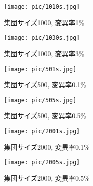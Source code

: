 \documentclass[a4j]{jarticle}
\begin{document}
\begin{figure}[htb]
 \begin{minipage}{0.5\hsize}
  \begin{center}
  \texttt{[image: pic/1010s.jpg]}
  \end{center}
  \caption{集団サイズ1000, 変異率1\%}
  \label{1010s}
 \end{minipage}
 \begin{minipage}{0.5\hsize}
  \begin{center}
  \texttt{[image: pic/1030s.jpg]}
  \end{center}
  \caption{集団サイズ1000, 変異率3\%}
  \label{1030s}
 \end{minipage}
\end{figure}

\begin{figure}[htb]
 \begin{minipage}{0.5\hsize}
  \begin{center}
  \texttt{[image: pic/501s.jpg]}
  \end{center}
  \caption{集団サイズ500, 変異率0.1\%}
  \label{501s}
 \end{minipage}
 \begin{minipage}{0.5\hsize}
  \begin{center}
  \texttt{[image: pic/505s.jpg]}
  \end{center}
  \caption{集団サイズ500, 変異率0.5\%}
  \label{505s}
 \end{minipage}
\end{figure}

\begin{figure}[htb]
 \begin{minipage}{0.5\hsize}
  \begin{center}
  \texttt{[image: pic/2001s.jpg]}
  \end{center}
  \caption{集団サイズ2000, 変異率0.1\%}
  \label{2001s}
 \end{minipage}
 \begin{minipage}{0.5\hsize}
  \begin{center}
  \texttt{[image: pic/2005s.jpg]}
  \end{center}
  \caption{集団サイズ2000, 変異率0.5\%}
  \label{2005s}
 \end{minipage}
\end{figure}
\end{document}
